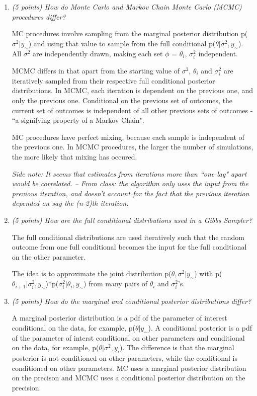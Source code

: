 \documentclass{article}\usepackage[]{graphicx}\usepackage[]{color}
\begin{document}
\begin{enumerate}
\item%
{\it (5 points) How do Monte Carlo and Markov Chain Monte Carlo (MCMC) procedures differ?}

MC procedures involve sampling from the marginal posterior distribution p($\sigma^2 | y_{\sim}$) and using that value to sample from the full conditional p($\theta | \sigma^2, y_{\sim}$). All $\sigma^2$ are independently drawn, making each set $\phi$ = {$\theta_{i}$, $\sigma^2_{i}$} independent.

MCMC differs in that apart from the starting value of $\sigma^2$, $\theta_{i}$ and $\sigma^2_{i}$ are iteratively sampled from their respective full conditional posterior distributions. In MCMC, each iteration is dependent on the previous one, and only the previous one. Conditional on the previous set of outcomes, the current set of outcomes is independent of all other previous sets of outcomes - ``a signifying property of a Markov Chain". 

MC procedures have perfect mixing, because each sample is independent of the previous one. In MCMC procedures, the larger the number of simulations, the more likely that mixing has occured.


{\it Side note: It seems that estimates from iterations more than ``one lag" apart would be correlated. -- From class: the algorithm only uses the input from the previous iteration, and doesn't account for the fact that the previous iteration depended on say the (n-2)th iteration.}


\item {\it (5 points) How are the full conditional distributions used in a Gibbs Sampler?}

The full conditional distributions are used iteratively such that the random outcome from one full conditional becomes the input for the full conditional on the other parameter.  

The idea is to approximate the joint distribution p($\theta,\sigma^2 | y_{\sim}$) with p($\theta_{i+1} |\sigma^2_{i},y_{\sim}$)*p($\sigma^2_{i}|\theta_{i},y_{\sim}$) from many pairs of $\theta_{i}$ and $\sigma^2_{i}$'s. 

\item%
{\it (5 points) How do the marginal and conditional posterior distributions differ?}

A marginal posterior distribution is a pdf of the parameter of interest conditional on the data, for example, p($\theta | y_{\sim}$). A conditional posterior is a pdf of the parameter of interst conditional on other parameters and conditional on the data, for example, p($\theta|\sigma^2,y_{i}$). The difference is that the marginal posterior is not conditioned on other parameters, while the conditional is conditioned on other parameters. MC uses a marginal posterior distribution on the precison and MCMC uses a conditional posterior distribution on the precision.


\end{enumerate}
\end{document}
